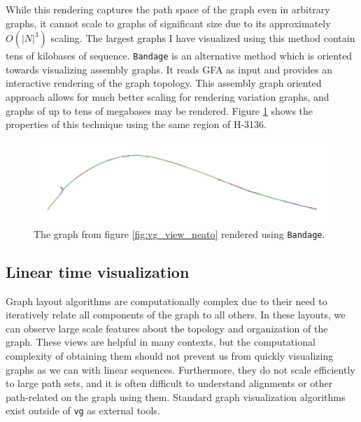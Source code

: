 While this rendering captures the path space of the graph even in arbitrary graphs, it cannot scale to graphs of significant size due to its approximately $O(|N|^3)$ scaling.
The largest graphs I have visualized using this method contain tens of kilobases of sequence.
{\tt Bandage} \cite{wick2015bandage} is an alternative method which is oriented towards visualizing assembly graphs.
It reads GFA as input and provides an interactive rendering of the graph topology.
This assembly graph oriented approach allows for much better scaling for rendering variation graphs, and graphs of up to tens of megabases may be rendered.
Figure \ref{fig:vg_view_bandage} shows the properties of this technique using the same region of H-3136.

\begin{figure}[htbp!] 
\centering    
\includegraphics[width=1.0\textwidth]{Chapter2/Figs/vg_view_H-3136_Bandage.pdf}
\caption[Force-directed layout with Bandage]{The graph from figure \ref{fig:vg_view_neato} rendered using {\tt Bandage}.}
\label{fig:vg_view_bandage}
\end{figure}

\subsection{Linear time visualization}

Graph layout algorithms are computationally complex due to their need to iteratively relate all components of the graph to all others.
In these layouts, we can observe large scale features about the topology and organization of the graph.
These views are helpful in many contexts, but the computational complexity of obtaining them should not prevent us from quickly visualizing graphs as we can with linear sequences.
Furthermore, they do not scale efficiently to large path sets, and it is often difficult to understand alignments or other path-related on the graph using them.
Standard graph visualization algorithms exist outside of {\tt vg} as external tools.

